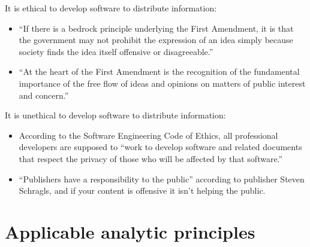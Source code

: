 \documentclass[11pt]{article}
\begin{document}
It is ethical to develop software to distribute information:
\begin{itemize}
\item ``If there is a bedrock principle underlying the First Amendment, it is that the government may not prohibit the expression of an idea simply because society finds the idea itself offensive or disagreeable.'' \cite[414]{1989texas}
\item ``At the heart of the First Amendment is the recognition of the fundamental importance of the free flow of ideas and opinions on matters of public interest and concern.'' \cite[51]{1988hustler}
\end{itemize}

It is unethical to develop software to distribute information:
\begin{itemize}
\item According to the Software Engineering Code of Ethics, all professional developers are supposed to ``work to develop software and related documents that respect the privacy of those who will be affected by that software.'' \cite{secode}
\item ``Publishers have a responsibility to the public'' according to publisher Steven Schragls, and if your content is offensive it isn't helping the public. \cite[46]{hawker}
\end{itemize}

\section{Applicable analytic principles}
\end{document}
